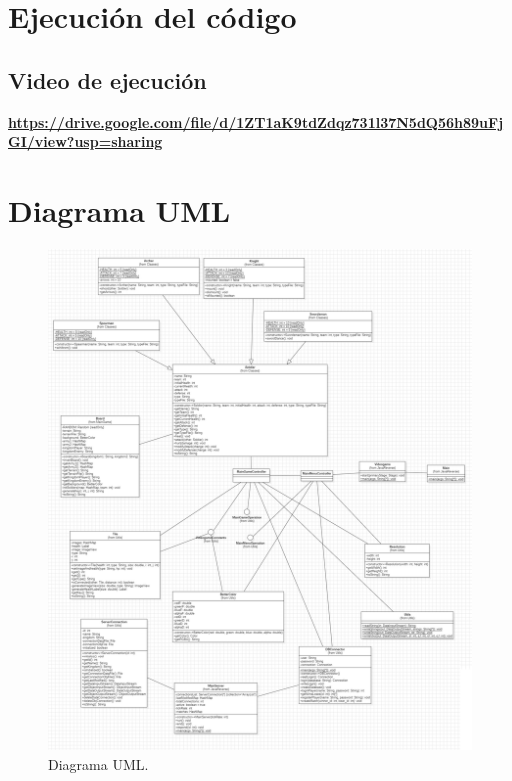 \documentclass{article}
\begin{document}
\section{Ejecución del código}
\subsection{Video de ejecución}
\bf{\url{https://drive.google.com/file/d/1ZT1aK9tdZdqz731l37N5dQ56h89uFjGI/view?usp=sharing}}
\pagebreak

\section{Diagrama UML}
\begin{figure}[H]
	\centering
	\includegraphics[width=1\textwidth,keepaspectratio]{img/uml.png}
	\caption{Diagrama UML.}
\end{figure}
\pagebreak
\end{document}
